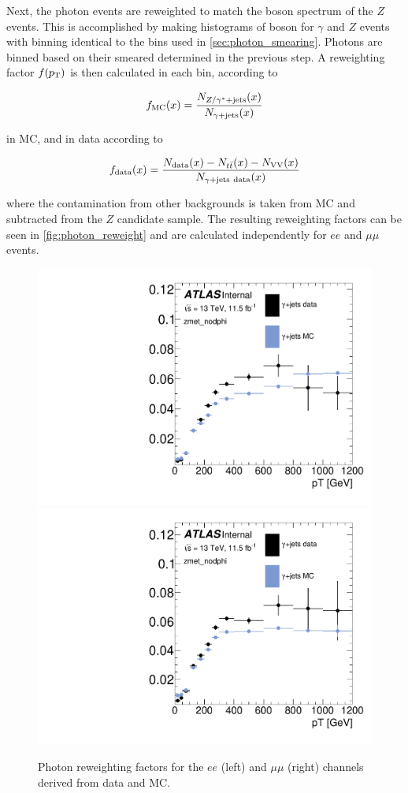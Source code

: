 Next, the photon events are reweighted to match the boson \pt spectrum of the $Z$ events. This is accomplished by making histograms of boson \pt for $\gamma$ and $Z$ events with binning identical to the \pt bins used in \autoref{sec:photon_smearing}. Photons are binned based on their smeared \pt determined in the previous step. A reweighting factor $f(p_{\text{T}})$ is then calculated in each bin, according to

\begin{equation}
f_\text{MC}(x) = \frac{N_{Z/\gamma^{*}+\text{jets}}(x)}{N_{\gamma+\text{jets}}(x)}
\end{equation}

in \ac{MC}, and in data according to

\begin{equation}
f_\text{data}(x) = \frac{N_{\text{data}}(x)-N_{t\bar{t}}(x)-N_{\text{VV}}(x)}{N_{\gjets\ \text{data}}(x)}
\end{equation}

where the contamination from other backgrounds is taken from \ac{MC} and subtracted from the $Z$ candidate sample. The resulting reweighting factors can be seen in \autoref{fig:photon_reweight} and are calculated independently for $ee$ and $\mu\mu$ events. 

\begin{centering}
\begin{figure}[!hbt]
\myfloatalign
\includegraphics[width=.45\linewidth]{figures/photons/Corr_hist_ptrw_ee_2j_2016_mcmetl_ptsmrw_smear_zmet_nodphi_.pdf}
\includegraphics[width=.45\linewidth]{figures/photons/Corr_hist_ptrw_mm_2j_2016_mcmetl_ptsmrw_smear_zmet_nodphi_.pdf}
\caption{Photon reweighting factors for the $ee$ (left) and $\mu\mu$ (right) channels derived from data and \ac{MC}.}
\label{fig:photon_reweight}
\end{figure}
\end{centering}

